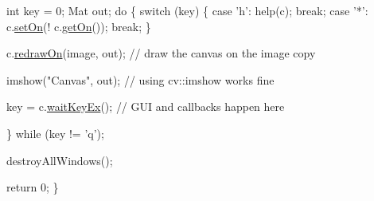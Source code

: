 \begin{DoxyCode}
    \textcolor{keywordtype}{int} key = 0;
    Mat out;
    \textcolor{keywordflow}{do}
    \{
        \textcolor{keywordflow}{switch} (key)
        \{
        \textcolor{keywordflow}{case} \textcolor{charliteral}{'h'}:
            help(c);
            \textcolor{keywordflow}{break};
        \textcolor{keywordflow}{case} \textcolor{charliteral}{'*'}:
            c.\hyperlink{classcanvascv_1_1Canvas_aba149ea25c6cdad2673133a060355954}{setOn}(! c.\hyperlink{classcanvascv_1_1Canvas_afe6a2955a5bbee8903350b4fba3f4473}{getOn}());
            \textcolor{keywordflow}{break};
        \}

        c.\hyperlink{classcanvascv_1_1Canvas_a018c66e277de7904b8146ea3f3feebdd}{redrawOn}(image, out);   \textcolor{comment}{// draw the canvas on the image copy}

        imshow(\textcolor{stringliteral}{"Canvas"}, out);    \textcolor{comment}{// using cv::imshow works fine}

        key = c.\hyperlink{classcanvascv_1_1Canvas_a59397db05f5d9e45264f626f6a2ae528}{waitKeyEx}(); \textcolor{comment}{// GUI and callbacks happen here}

    \} \textcolor{keywordflow}{while} (key != \textcolor{charliteral}{'q'});

    destroyAllWindows();

    \textcolor{keywordflow}{return} 0;
\}
\end{DoxyCode}


